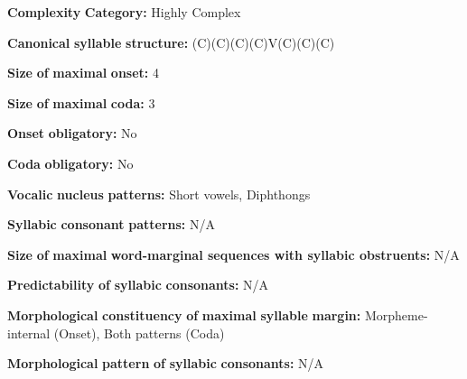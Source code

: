 \documentclass[output=paper]{langsci/langscibook}
\begin{document}
\begin{styleBody}
\textbf{Complexity} \textbf{Category:} Highly Complex
\end{styleBody}

\begin{styleBody}
\textbf{Canonical} \textbf{syllable} \textbf{structure:} (C)(C)(C)(C)V(C)(C)(C) \citep[391-401]{Clairis1985}
\end{styleBody}

\begin{styleBody}
\textbf{Size} \textbf{of} \textbf{maximal} \textbf{onset:} 4
\end{styleBody}

\begin{styleBody}
\textbf{Size} \textbf{of} \textbf{maximal} \textbf{coda:} 3
\end{styleBody}

\begin{styleBody}
\textbf{Onset} \textbf{obligatory:} No
\end{styleBody}

\begin{styleBody}
\textbf{Coda} \textbf{obligatory:} No
\end{styleBody}

\begin{styleBody}
\textbf{Vocalic} \textbf{nucleus} \textbf{patterns:} Short vowels, Diphthongs
\end{styleBody}

\begin{styleBody}
\textbf{Syllabic} \textbf{consonant} \textbf{patterns:} N/A
\end{styleBody}

\begin{styleBody}
\textbf{Size} \textbf{of} \textbf{maximal} \textbf{word{}-marginal sequences with syllabic obstruents:} N/A
\end{styleBody}

\begin{styleBody}
\textbf{Predictability} \textbf{of} \textbf{syllabic} \textbf{consonants:} N/A 
\end{styleBody}

\begin{styleBody}
\textbf{Morphological} \textbf{constituency} \textbf{of} \textbf{maximal} \textbf{syllable} \textbf{margin:} Morpheme-internal (Onset), Both patterns (Coda)
\end{styleBody}

\begin{styleBody}
\textbf{Morphological} \textbf{pattern} \textbf{of} \textbf{syllabic} \textbf{consonants:} N/A
\end{styleBody}
\end{document}
